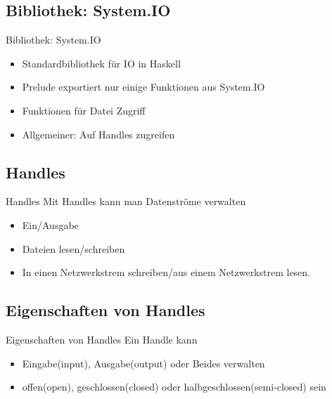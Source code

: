 \documentclass{beamer}
\begin{document}
\subsection{Bibliothek: System.IO}
\begin{frame}{Bibliothek: System.IO}
\begin{itemize}
\item Standardbibliothek für IO in Haskell
\item Prelude exportiert nur einige Funktionen aus System.IO
\item Funktionen für Datei Zugriff
\item Allgemeiner: Auf Handles zugreifen
\end{itemize}
\end{frame}

\subsection{Handles}
\begin{frame}[<+->]{Handles}
Mit Handles kann man Datenströme verwalten
\begin{itemize}
\item Ein/Ausgabe
\item Dateien lesen/schreiben
\item In einen Netzwerkstrem schreiben/aus einem Netzwerkstrem lesen.
\end{itemize}
\end{frame}

\subsection{Eigenschaften von Handles}
\begin{frame}[<+->]{Eigenschaften von Handles}
Ein Handle kann
\begin{itemize}
\item Eingabe(input), Ausgabe(output) oder Beides verwalten
\item offen(open), geschlossen(closed) oder halbgeschlossen(semi-closed) sein
\end{itemize}
\end{frame}
\end{document}
